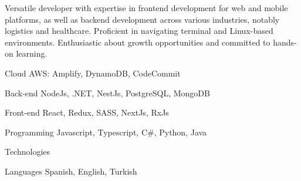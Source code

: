 

\begin{cvparagraph}

  Versatile developer with expertise in frontend development for web and mobile platforms, 
  as well as backend development across various industries, notably logistics and healthcare.
  Proficient in navigating terminal and Linux-based environments. Enthusiastic about growth opportunities and committed to hands-on learning.


\begin{cvskills}

      \cvskill
        {Cloud} %
        {AWS: Amplify, DynamoDB, CodeCommit} %
    
      \cvskill
        {Back-end} %
        {NodeJs, .NET, NestJs, PostgreSQL, MongoDB} %
    
      \cvskill
        {Front-end} %
        {React, Redux, SASS, NextJs, RxJs} %
    
      \cvskill
        {Programming} %
        {Javascript, Typescript, C\#, Python, Java} %
    
      \cvskill
      {Technologies} %
      {} %
    
      \cvskill
        {Languages} %
        {Spanish, English, Turkish} %
    
    \end{cvskills}
    

\end{cvparagraph}
